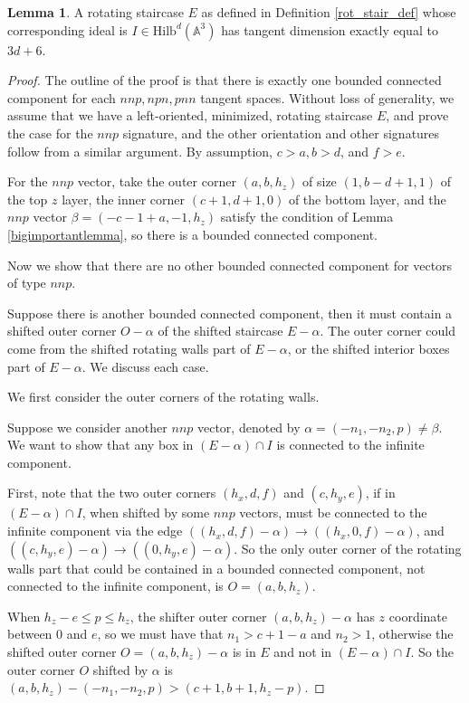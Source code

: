 \documentclass{amsart}[10pt]
\theoremstyle{plain}
\theoremstyle{definition}
\newtheorem{lemma}[theorem]{Lemma}
\newcommand{\Hilb}{\mathrm{Hilb}}
\begin{document}
\begin{lemma}
\label{rot_stair_one_comp}
A rotating staircase $E$ as defined in Definition \ref{rot_stair_def} whose corresponding ideal is $I \in \Hilb^d(\mathbb{A}^3)$ has tangent dimension exactly equal to $3d+6$.
\end{lemma}

\begin{proof}
The outline of the proof is that there is exactly one bounded connected component for each $nnp, npn, pnn$ tangent spaces. Without loss of generality, we assume that we have a left-oriented, minimized, rotating staircase $E$, and prove the case for the $nnp$ signature, and the other orientation and other signatures follow from a similar argument. By assumption, $c>a, b>d$, and $f>e$.

For the $nnp$ vector, take the outer corner $(a, b,h_z)$ of size $(1, b-d+1, 1)$ of the top $z$ layer, the inner corner $(c+1,d+1,0)$ of the bottom layer, and the $nnp$ vector $\beta=(-c-1+a, -1,h_z)$ satisfy the condition of Lemma \ref{bigimportantlemma}, so there is a bounded connected component. 


Now we show that there are no other bounded connected component for vectors of type $nnp$. 

Suppose there is another bounded connected component, then it must contain a shifted outer corner $O-\alpha$ of the shifted staircase $E-\alpha$. The outer corner could come from the shifted rotating walls part of $E-\alpha$, or the shifted interior boxes part of $E-\alpha$. We discuss each case.

We first consider the outer corners of the rotating walls.

Suppose we consider another $nnp$ vector, denoted by $\alpha=(-n_1, -n_2, p) \neq \beta$. We want to show that any box in $(E- \alpha) \cap I$ is connected to the infinite component.

First, note that the two outer corners $(h_x, d,f)$ and $(c, h_y, e)$, if in $(E- \alpha) \cap I$, when shifted by some $nnp$ vectors, must be connected to the infinite component via the edge $((h_x, d,f)-\alpha) \rightarrow ((h_x, 0,f)-\alpha)$, and $((c, h_y, e)-\alpha) \rightarrow ((0, h_y, e)-\alpha)$. So the only outer corner of the rotating walls part that could be contained in a bounded connected component, not connected to the infinite component, is $O=(a, b, h_z)$. 

When $h_z-e \leq p \leq h_z$, the shifter outer corner $(a, b, h_z)-\alpha$ has $z$ coordinate between $0$ and $e$, so we must have that $n_1 > c+1-a$ and $n_2 > 1$, otherwise the shifted outer corner $O=(a, b, h_z) -\alpha$ is in $E$ and not in $(E- \alpha) \cap I$. %
So the outer corner $O$ shifted by $\alpha$ is $(a, b, h_z)-(-n_1, -n_2, p)>(c+1, b+1,h_z-p)$. 


\end{proof}
\end{document}
